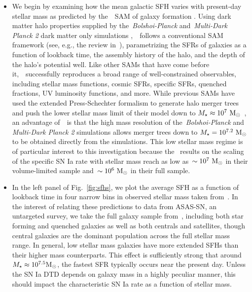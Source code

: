 \documentclass[ms.tex]{subfiles}
\begin{document}
\begin{itemize}

	\item We begin by examining how the mean galactic SFH varies with
	present-day stellar mass as predicted by the~\um~SAM of galaxy formation
	\citep{Behroozi2019}.
	Using dark matter halo properties supplied by the~\textit{Bolshoi-Planck}
	and~\textit{Multi-Dark Planck 2} dark matter only simulations
	\citep{Klypin2016, RodriguezPuebla2016},~\um~follows a conventional
	SAM framework (see, e.g., the review in~\citealp{Somerville2015a}),
	parametrizing the SFRs of galaxies as a function of lookback time, the
	assembly history of the halo, and the depth of the halo's potential well.
	Like other SAMs that have come before it,~\um~successfully reproduces a
	broad range of well-constrained observables, including stellar mass
	functions, cosmic SFRs, specific SFRs, quenched fractions, UV luminosity
	functions, and more.
	While previous SAMs have used the extended Press-Schechter formalism
	\citep{Press1974, Bond1991} to generate halo merger trees and push the
	lower stellar mass limit of their model down to
	$M_\star \approx 10^7~\text{M}_\odot$~\citep*[e.g.][]{Somerville2015b}, an advantage
	of~\um~is that the high mass resolution of the~\textit{Bolshoi-Planck} and
	\textit{Multi-Dark Planck 2} simulations allows merger trees down to
	$M_\star = 10^{7.2}~\text{M}_\odot$ to be obtained directly from the simulations.
	This low stellar mass regime is of particular interest to this
	investigation because the~\citet{Brown2019} results on the scaling of the
	specific SN Ia rate with stellar mass reach as low as~$\sim10^7~\text{M}_\odot$ in
	their volume-limited sample and~$\sim10^6~\text{M}_\odot$ in their full sample.

	\item In the left panel of Fig.~\ref{fig:sfhs}, we plot the average SFH as
	a function of lookback time in four narrow bins in observed stellar mass
	taken from~\um.
	In the interest of relating these predictions to data from ASAS-SN, an
	untargeted survey, we take the full galaxy sample from~\um, including both
	star forming and quenched galaxies as well as both centrals and satellites,
	though central galaxies are the dominant population across the full stellar
	mass range.
	In general, low stellar mass galaxies have more extended SFHs than their
	higher mass counterparts.
	This effect is sufficiently strong that around~$M_\star \approx 10^{7.5}
	\text{M}_\odot$, the fastest SFR typically occurs near the present day.
	Unless the SN Ia DTD depends on galaxy mass in a highly peculiar manner,
	this should impact the characteristic SN Ia rate as a function of stellar
	mass.


\end{itemize}
\end{document}
